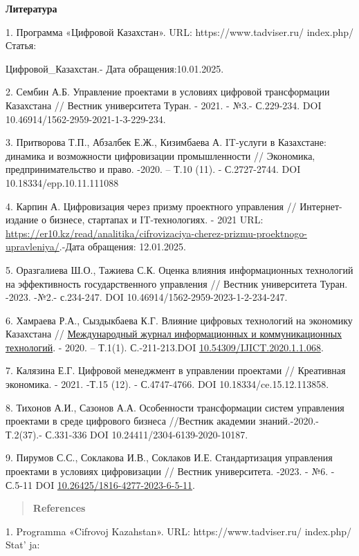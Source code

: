 {\bfseries Литература}

1. Программа «Цифровой Казахстан». URL: https://www.tadviser.ru/
index.php/ Статья:

Цифровой\_Казахстан.- Дата обращения:10.01.2025.

2. Сембин А.Б. Управление проектами в условиях цифровой трансформации
Казахстана // Вестник университета Туран. - 2021. - №3.- С.229-234. DOI
10.46914/1562-2959-2021-1-3-229-234.

3. Притворова Т.П., Абзалбек Е.Ж., Кизимбаева А. IT-услуги в Казахстане:
динамика и возможности цифровизации промышленности // Экономика,
предпринимательство и право. -2020. -- Т.10 (11). - С.2727-2744. DOI
10.18334/epp.10.11.111088

4. Карпин А. Цифровизация через призму проектного управления //
Интернет-издание о бизнесе, стартапах и IT-технологиях. - 2021 URL:
\url{https://er10.kz/read/analitika/cifrovizaciya-cherez-prizmu-proektnogo-upravleniya/}.-Дата
обращения: 12.01.2025.

5. Оразгалиева Ш.О., Тажиева С.К. Оценка влияния информационных
технологий на эффективность государственного управления // Вестник
университета Туран. -2023. -№2.- с.234-247. DOI
10.46914/1562-2959-2023-1-2-234-247.

6. Хамраева Р.А., Сыздыкбаева К.Г. Влияние цифровых технологий на
экономику Казахстана //
\href{https://journal.iitu.edu.kz/index.php/ijict/issue/view/1}{Международный
журнал информационных и коммуникационных технологий}. - 2020. -- Т.1(1).
С.-211-213.DOI
\href{https://doi.org/10.54309/IJICT.2020.1.1.068}{10.54309/IJICT.2020.1.1.068}.

7. Калязина Е.Г. Цифровой менеджмент в управлении проектами // Креативная
экономика. - 2021. -Т.15 (12). - С.4747-4766. DOI
10.18334/ce.15.12.113858.

8. Тихонов А.И., Сазонов А.А. Особенности трансформации систем управления
проектами в среде цифрового бизнеса //Вестник академии
знаний.-2020.-Т.2(37).- С.331-336 DOI 10.24411/2304-6139-2020-10187.

9. Пирумов С.С., Соклакова И.В., Соклаков И.Е. Стандартизация управления
проектами в условиях цифровизации // Вестник университета. -2023. - №6.
- С.5-11 DOI
\href{https://doi.org/10.26425/1816-4277-2023-6-5-11}{10.26425/1816-4277-2023-6-5-11}.

\begin{quote}
{\bfseries References}
\end{quote}

1. Programma «Cifrovoj Kazahstan». URL: https://www.tadviser.ru/
index.php/ Stat' ja:

